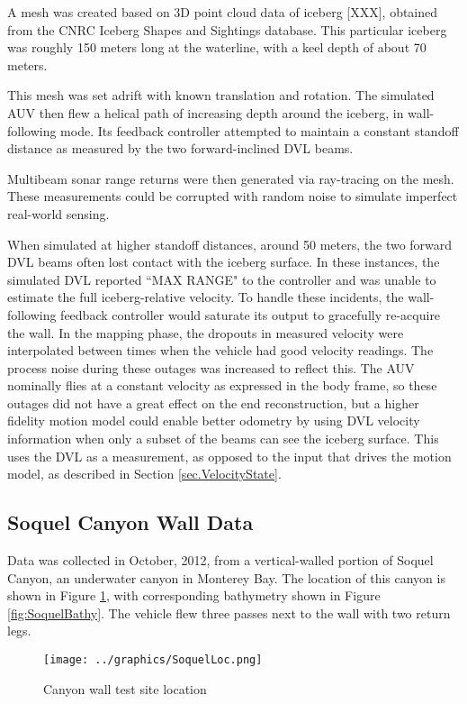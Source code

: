 A mesh was created based on 3D point cloud data of iceberg [XXX], obtained from the CNRC Iceberg Shapes and Sightings database. \cite{Verbit2006} This particular iceberg was roughly 150 meters long at the waterline, with a keel depth of about 70 meters.

This mesh was set adrift with known translation and rotation. The simulated AUV then flew a helical path of increasing depth around the iceberg, in wall-following mode. Its feedback controller attempted to maintain a constant standoff distance as measured by the two forward-inclined DVL beams.

Multibeam sonar range returns were then generated via ray-tracing on the mesh. These measurements could be corrupted with random noise to simulate imperfect real-world sensing. 

When simulated at higher standoff distances, around 50 meters, the two forward DVL beams often lost contact with the iceberg surface. In these instances, the simulated DVL reported ``MAX RANGE" to the controller and was unable to estimate the full iceberg-relative velocity. To handle these incidents, the wall-following feedback controller would saturate its output to gracefully re-acquire the wall. In the mapping phase, the dropouts in measured velocity were interpolated between times when the vehicle had good velocity readings. The process noise during these outages was increased to reflect this. The AUV nominally flies at a constant velocity as expressed in the body frame, so these outages did not have a great effect on the end reconstruction, but a higher fidelity motion model could enable better odometry by using DVL velocity information when only a subset of the beams can see the iceberg surface. This uses the DVL as a measurement, as opposed to the input that drives the motion model, as described in Section \ref{sec.VelocityState}.

\subsection{Soquel Canyon Wall Data}

Data was collected in October, 2012, from a vertical-walled portion of Soquel Canyon, an underwater canyon in Monterey Bay. The location of this canyon is shown in Figure \ref{fig:SoquelLoc}, with corresponding bathymetry shown in Figure \ref{fig:SoquelBathy}. The vehicle flew three passes next to the wall with two return legs.

 \begin{figure}[!htb]
   \centering
   \texttt{[image: ../graphics/SoquelLoc.png]} %
   \caption{Canyon wall test site location}
   \label{fig:SoquelLoc}
\end{figure}

